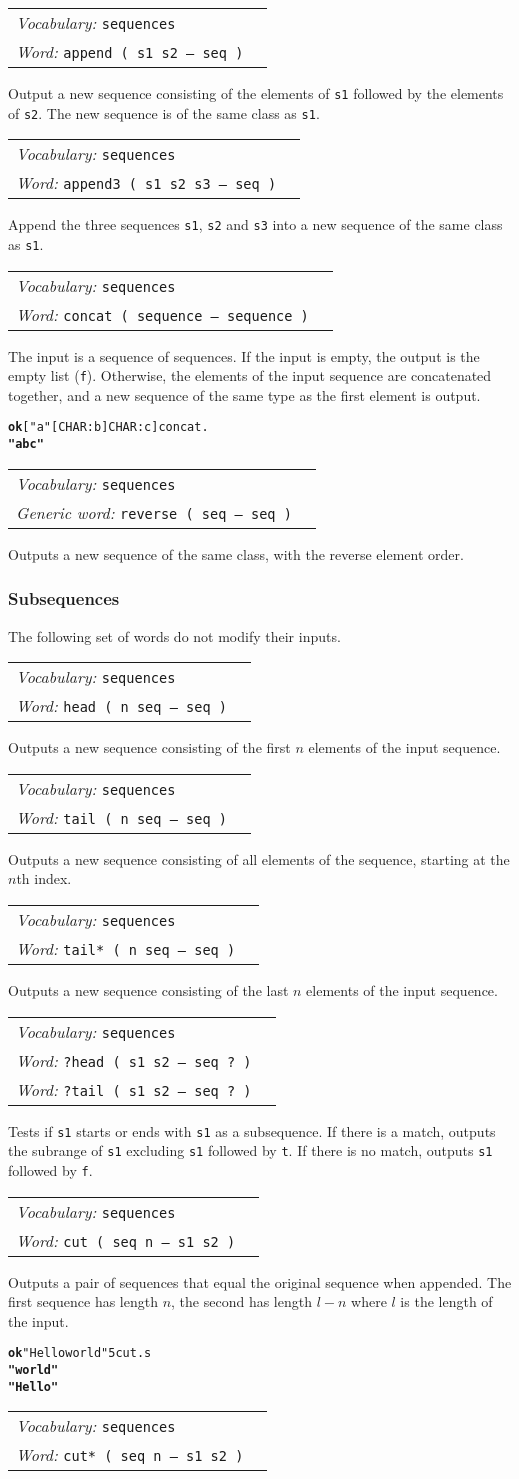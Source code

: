 \documentclass{book}
\newcommand{\tto}{\symbol{123}}
\newcommand{\ttc}{\symbol{125}}
\newcommand{\vocabulary}[1]{\emph{Vocabulary:} \texttt{#1}&\\}
\newcommand{\ordinaryword}[2]{\index{\texttt{#1}}\emph{Word:} \texttt{#2}&\\}
\newcommand{\genericword}[2]{\index{\texttt{#1}}\emph{Generic word:} \texttt{#2}&\\}
\newcommand{\wordtable}[1]{


\begin{tabularx}{12cm}{lX}
\hline
#1
\hline
\end{tabularx}

}
\begin{document}
\wordtable{
\vocabulary{sequences}
\ordinaryword{append}{append ( s1 s2 -- seq )}
}
Output a new sequence consisting of the elements of \texttt{s1} followed by the elements of \texttt{s2}. The new sequence is of the same class as \texttt{s1}.
\wordtable{
\vocabulary{sequences}
\ordinaryword{append3}{append3 ( s1 s2 s3 -- seq )}
}
Append the three sequences \texttt{s1}, \texttt{s2} and \texttt{s3} into a new sequence of the same class as \texttt{s1}.
\wordtable{
\vocabulary{sequences}
\ordinaryword{concat}{concat ( sequence -- sequence )}
}
The input is a sequence of sequences. If the input is empty, the output is the empty list (\texttt{f}). Otherwise, the elements of the input sequence are concatenated together, and a new sequence of the same type as the first element is output.
\begin{alltt}
\textbf{ok} [ "a" [ CHAR: b ] \tto CHAR: c \ttc ] concat .
\textbf{"abc"}
\end{alltt}
\wordtable{
\vocabulary{sequences}
\genericword{reverse}{reverse ( seq -- seq )}
}
Outputs a new sequence of the same class, with the reverse element order.

\subsubsection{\label{subseq}Subsequences}

The following set of words do not modify their inputs.

\wordtable{
\vocabulary{sequences}
\ordinaryword{head}{head~( n seq -- seq )}
}
Outputs a new sequence consisting of the first $n$ elements of the input sequence.
\wordtable{
\vocabulary{sequences}
\ordinaryword{tail}{tail~( n seq -- seq )}
}
Outputs a new sequence consisting of all elements of the sequence, starting at the $n$th index.
\wordtable{
\vocabulary{sequences}
\ordinaryword{tail*}{tail*~( n seq -- seq )}
}
Outputs a new sequence consisting of the last $n$ elements of the input sequence.
\wordtable{
\vocabulary{sequences}
\ordinaryword{?head}{?head~( s1 s2 -- seq ?~)}
\ordinaryword{?tail}{?tail~( s1 s2 -- seq ?~)}
}
Tests if \texttt{s1} starts or ends with \texttt{s1} as a subsequence. If there is a match, outputs the subrange of \texttt{s1} excluding \texttt{s1} followed by \texttt{t}. If there is no match, outputs \texttt{s1} followed by \texttt{f}.
\wordtable{
\vocabulary{sequences}
\ordinaryword{cut}{cut ( seq n -- s1 s2 )}
}
Outputs a pair of sequences that equal the original sequence when appended. The first sequence has length $n$, the second has length $l-n$ where $l$ is the length of the input.
\begin{alltt}
\textbf{ok} "Hello world" 5 cut .s
\textbf{" world"
"Hello"}
\end{alltt}
\wordtable{
\vocabulary{sequences}
\ordinaryword{cut*}{cut* ( seq n -- s1 s2 )}
}
\end{document}
